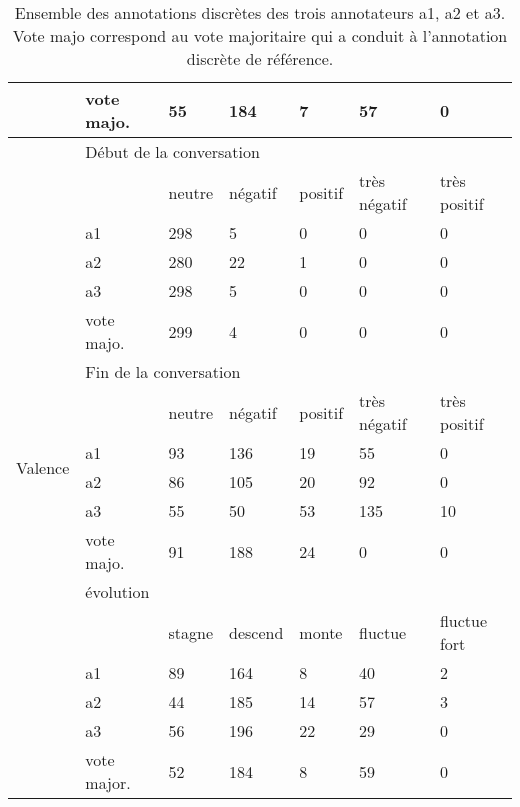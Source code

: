 \begin{table}
\begin{tabular}{|l|l|l|l|l|l|l|}
      & vote majo. & 55     & 184     & 7         & 57           & 0                 \\ \hline \hline
\multirow{18}{*}{Valence}             & \multicolumn{6}{l|}{Début de la conversation}                                      \\ \cline{2-7}
      &                  & neutre & négatif & positif   & très négatif & très positif      \\ \cline{2-7}
      & a1               & 298    & 5       & 0         & 0            & 0                 \\ \cline{2-7}
      & a2               & 280    & 22      & 1         & 0            & 0                 \\ \cline{2-7}
      & a3               & 298    & 5       & 0         & 0            & 0                 \\ \cline{2-7}
      & vote majo. & 299    & 4       & 0         & 0            & 0                 \\ \cline{2-7}
      & \multicolumn{6}{l|}{Fin de la conversation}                                        \\ \cline{2-7}
      &                  & neutre & négatif & positif   & très négatif & très positif      \\ \cline{2-7}
      & a1               & 93     & 136     & 19        & 55           & 0                 \\ \cline{2-7}
      & a2               & 86     & 105     & 20        & 92           & 0                 \\ \cline{2-7}
      & a3               & 55     & 50      & 53        & 135          & 10                \\ \cline{2-7}
      & vote majo. & 91     & 188     & 24        & 0            & 0                 \\ \cline{2-7}
      & \multicolumn{6}{l|}{évolution}                                                     \\ \cline{2-7}
      &                  & stagne & descend & monte     & fluctue      & fluctue fort \\ \cline{2-7}
      & a1               & 89     & 164     & 8         & 40           & 2                 \\ \cline{2-7}
      & a2               & 44     & 185     & 14        & 57           & 3                 \\ \cline{2-7}
      & a3               & 56     & 196     & 22        & 29           & 0                 \\ \cline{2-7}
      & vote major. & 52     & 184     & 8         & 59           & 0                 \\ \hline
\end{tabular}
\caption{Ensemble des annotations discrètes des trois annotateurs a1, a2 et a3. Vote majo correspond au vote majoritaire qui a conduit à l'annotation discrète de référence.}
\label{tab:statistiqueAnnotation}
\end{table}
